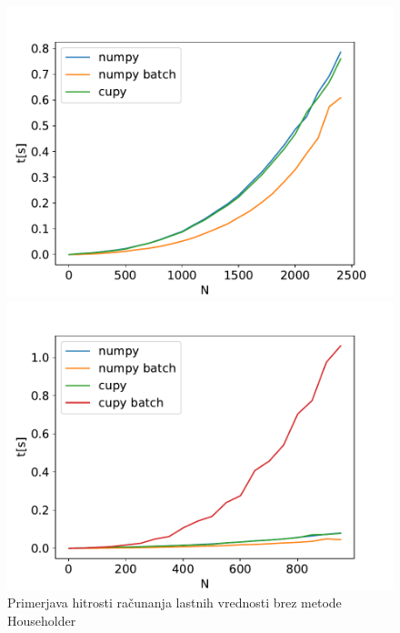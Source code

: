 \documentclass{article}
\begin{document}
\begin{figure}[H]
    \centering
    \begin{minipage}{0.49\textwidth}
        \centering
        \includegraphics[width=\linewidth]{cuda.pdf}
    \end{minipage}
    \hfill
    \begin{minipage}{0.49\textwidth}
        \centering
        \includegraphics[width=\linewidth]{batch.pdf}
    \end{minipage}
	\caption{Primerjava hitrosti računanja lastnih vrednosti brez metode Householder}
\end{figure}
\end{document}
